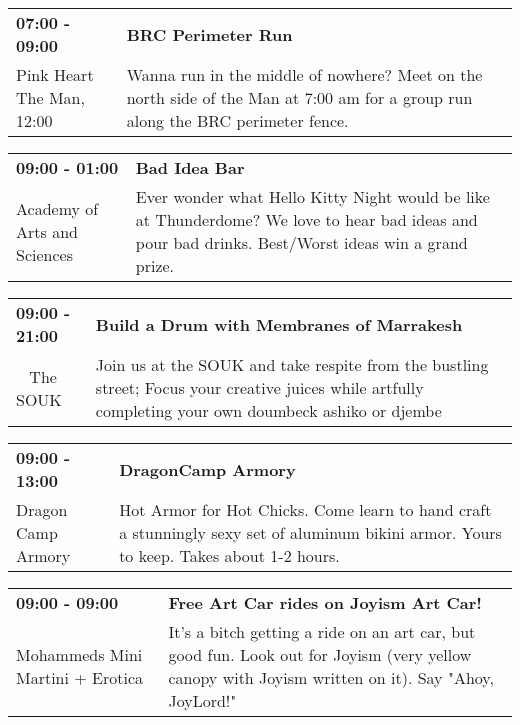 \begin{tabular}{ p{1in} p{2.2in} }
    \textbf{07:00 - 09:00} & \textbf{BRC Perimeter Run} \\
    Pink Heart \newline The Man, 12:00 & Wanna run in the middle of nowhere? Meet on the north side of the Man at 7:00 am for a group run along the BRC perimeter fence. \\
    \hline 
\end{tabular}
    
\begin{tabular}{ p{1in} p{2.2in} }
    \textbf{09:00 - 01:00} & \textbf{Bad Idea Bar} \\
    Academy of Arts and Sciences \newline  & Ever wonder what Hello Kitty Night would be like at Thunderdome? We love to hear bad ideas and pour bad drinks. Best/Worst ideas win a grand prize. \\
    \hline 
\end{tabular}
    
\begin{tabular}{ p{1in} p{2.2in} }
    \textbf{09:00 - 21:00} & \textbf{Build a Drum with Membranes of Marrakesh} \\
    ~ \newline The SOUK & Join us at the SOUK and take respite from the bustling street; Focus your creative juices while artfully completing your own doumbeck ashiko or djembe \\
    \hline 
\end{tabular}
    
\begin{tabular}{ p{1in} p{2.2in} }
    \textbf{09:00 - 13:00} & \textbf{DragonCamp Armory} \\
    Dragon Camp Armory \newline  & Hot Armor for Hot Chicks. Come learn to hand craft a stunningly sexy set of aluminum bikini armor. Yours to keep. Takes about 1-2 hours. \\
    \hline 
\end{tabular}
    
\begin{tabular}{ p{1in} p{2.2in} }
    \textbf{09:00 - 09:00} & \textbf{Free Art Car rides on Joyism Art Car!} \\
    Mohammeds Mini Martini + Erotica \newline  & It's a bitch getting a ride on an art car, but good fun. Look out for Joyism (very yellow canopy with Joyism written on it). Say "Ahoy, JoyLord!" \\
    \hline 
\end{tabular}
    
